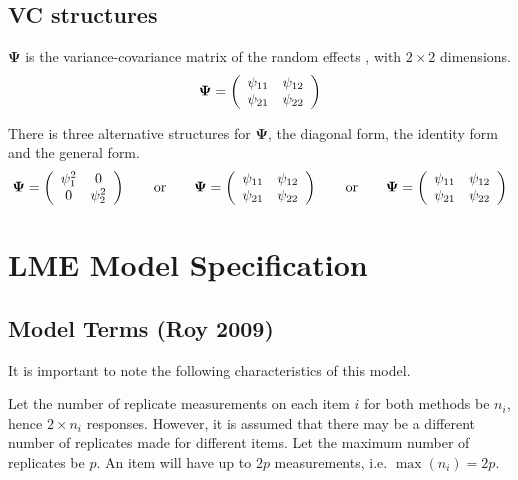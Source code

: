 \documentclass[12pt, a4paper]{report}
\theoremstyle{plain}
\theoremstyle{definition}
\theoremstyle{remark}
\begin{document}
\section{VC structures}
$\boldsymbol{\Psi}$ is the variance-covariance matrix of the random effects ,
with $2 \times 2$ dimensions.
\begin{equation}
\boldsymbol{\Psi} =
\left(%
\begin{array}{c c}
\psi_{11} & \psi_{12}  \\
\psi_{21} & \psi_{22}  \\
\end{array}%
\right)
\end{equation}

There is three alternative structures for
$\boldsymbol{\Psi}$, the diagonal form, the identity form and the general form.
\[
\boldsymbol{\Psi} =
\left(%
\begin{array}{c c}
\psi^2_1 & 0  \\
0 & \psi^2_2  \\
\end{array}%
\right)\qquad \mathrm{or} \qquad \boldsymbol{\Psi} =
\left(%
\begin{array}{c c}
\psi_{11} & \psi_{12}  \\
\psi_{21} & \psi_{22}  \\
\end{array}%
\right)
\qquad \mathrm{or} \qquad \boldsymbol{\Psi} =
\left(%
\begin{array}{c c}
\psi_{11} & \psi_{12}  \\
\psi_{21} & \psi_{22}  \\
\end{array}%
\right)
\]


\chapter{LME Model Specification}

\section{Model Terms (Roy 2009)}
It is important to note the following characteristics of this model.

Let the number of replicate measurements on each item $i$ for both methods be $n_i$, hence $2 \times n_i$ responses. However, it is assumed that there may be a different number of replicates made for different items. Let the maximum number of replicates be $p$. An item will have up to $2p$ measurements, i.e. $\max(n_{i}) = 2p$.
\end{document}
